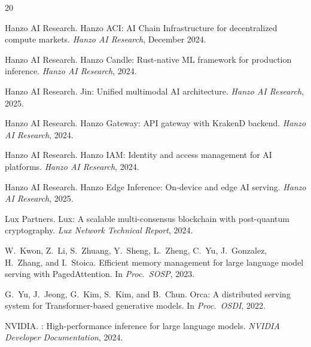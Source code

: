 \documentclass[11pt]{article}
\begin{document}
\begin{thebibliography}{20}

{Hanzo AI Research}.
\newblock Hanzo {ACI}: {AI} Chain Infrastructure for decentralized compute markets.
\newblock \emph{Hanzo AI Research}, December 2024.

{Hanzo AI Research}.
\newblock Hanzo Candle: Rust-native {ML} framework for production inference.
\newblock \emph{Hanzo AI Research}, 2024.

{Hanzo AI Research}.
\newblock Jin: Unified multimodal {AI} architecture.
\newblock \emph{Hanzo AI Research}, 2025.

{Hanzo AI Research}.
\newblock Hanzo Gateway: {API} gateway with {KrakenD} backend.
\newblock \emph{Hanzo AI Research}, 2024.

{Hanzo AI Research}.
\newblock Hanzo {IAM}: Identity and access management for {AI} platforms.
\newblock \emph{Hanzo AI Research}, 2024.

{Hanzo AI Research}.
\newblock Hanzo Edge Inference: On-device and edge {AI} serving.
\newblock \emph{Hanzo AI Research}, 2025.

{Lux Partners}.
\newblock Lux: A scalable multi-consensus blockchain with post-quantum cryptography.
\newblock \emph{Lux Network Technical Report}, 2024.

W.~Kwon, Z.~Li, S.~Zhuang, Y.~Sheng, L.~Zheng, C.~Yu, J.~Gonzalez, H.~Zhang, and I.~Stoica.
\newblock Efficient memory management for large language model serving with {PagedAttention}.
\newblock In \emph{Proc.\ SOSP}, 2023.

G.~Yu, J.~Jeong, G.~Kim, S.~Kim, and B.~Chun.
\newblock Orca: A distributed serving system for {Transformer}-based generative models.
\newblock In \emph{Proc.\ OSDI}, 2022.

{NVIDIA}.
: High-performance inference for large language models.
\newblock \emph{NVIDIA Developer Documentation}, 2024.

\end{thebibliography}
\end{document}
